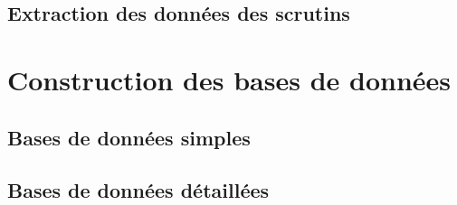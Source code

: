 \subsection{Extraction des données des scrutins}

\cleardoublepage

\section{Construction des bases de données}

\subsection{Bases de données simples}

\subsection{Bases de données détaillées}

\cleardoublepage

